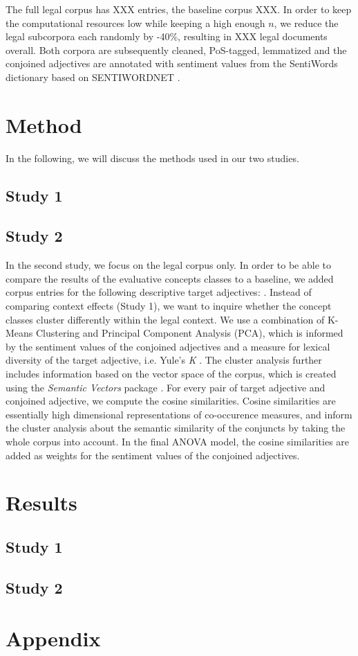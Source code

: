 \documentclass{article}
\begin{document}
The full legal corpus has XXX entries, the baseline corpus XXX. In order to keep the computational resources low while keeping a high enough $n$, we reduce the legal subcorpora each randomly by -40\%, resulting in XXX legal documents overall. Both corpora are subsequently cleaned, PoS-tagged, lemmatized and the conjoined adjectives are annotated with sentiment values from the SentiWords dictionary based on SENTIWORDNET \citep{Esuli2006, Baccianella2010, Guerini2013, Gatti2016}.

\section{Method}

In the following, we will discuss the methods used in our two studies.

\subsection{Study 1}



\subsection{Study 2}

In the second study, we focus on the legal corpus only. In order to be able to compare the results of the evaluative concepts classes to a baseline, we added corpus entries for the following descriptive target adjectives: . Instead of comparing context effects (Study 1), we want to inquire whether the concept classes cluster differently within the legal context. We use a combination of K-Means Clustering and Principal Component Analysis (PCA), which is informed by the sentiment values of the conjoined adjectives and a measure for lexical diversity of the target adjective, i.e. Yule's \textit{K} \citep{Yule1944, Tweedie1998}. The cluster analysis further includes information based on the vector space of the corpus, which is created using the \textit{Semantic Vectors} package \citep{Widdows2008, Widdows2010, Widdows2016}. For every pair of target adjective and conjoined adjective, we compute the cosine similarities. Cosine similarities are essentially high dimensional representations of co-occurence measures, and inform the cluster analysis about the semantic similarity of the conjuncts by taking the whole corpus into account. In the final ANOVA model, the cosine similarities are added as weights for the sentiment values of the conjoined adjectives.

\section{Results}

\subsection{Study 1}



\subsection{Study 2}




\section{Appendix}
\label{sec:appendix}
\end{document}

